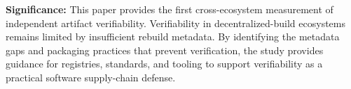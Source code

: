 \textbf{Significance:}
This paper provides the first cross-ecosystem measurement of independent artifact verifiability. 
Verifiability in decentralized-build ecosystems remains limited by insufficient rebuild metadata. By identifying the metadata gaps and packaging practices that prevent verification, the study provides guidance for registries, standards, and tooling to support verifiability as a practical software supply-chain defense.








